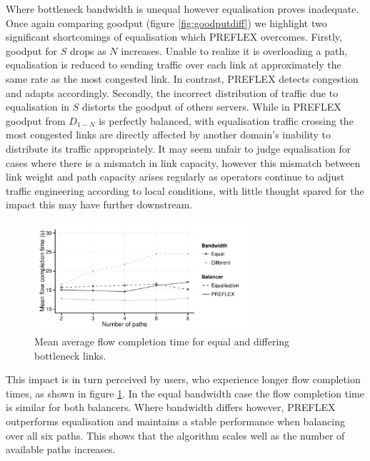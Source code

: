 Where bottleneck bandwidth is unequal however equalisation proves inadequate. 
Once again comparing goodput (figure \ref{fig:goodputdiff}) we highlight two significant shortcomings of equalisation which \ac{PREFLEX} overcomes. 
Firstly, goodput for $S$ drops as $N$ increases. 
Unable to realize it is overloading a path, equalisation is reduced to sending traffic over each link at approximately the same rate as the most congested link. 
In contrast, \ac{PREFLEX} detects congestion and adapts accordingly. 
Secondly, the incorrect distribution of traffic due to equalisation in $S$ distorts the goodput of others servers. 
While in \ac{PREFLEX} goodput from $D_{1-N}$ is perfectly balanced, with equalisation traffic crossing the most congested links are directly affected by another domain's inability to distribute its traffic appropriately.
It may seem unfair to judge equalisation for cases where there is a mismatch in link capacity, however this mismatch between link weight and path capacity arises regularly as operators continue to adjust traffic engineering according to local conditions, with little thought spared for the impact this may have further downstream.

\begin{figure}
    \centering
    \includegraphics[width=3.2in]{figures/cate/duration}
    \caption{Mean average flow completion time for equal and differing bottleneck links.}
    \label{fig:duration}
\end{figure}

This impact is in turn perceived by users, who experience longer flow completion times, as shown in figure \ref{fig:duration}. 
In the equal bandwidth case the flow completion time is similar for both balancers.  
Where bandwidth differs however, \ac{PREFLEX} outperforms equalisation and maintains a stable performance when balancing over all six paths.  
This shows that the algorithm scales well as the number of available paths increases. 

